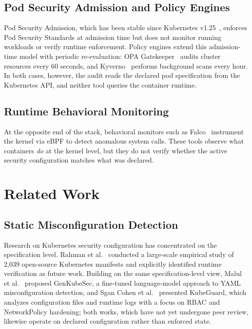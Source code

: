\documentclass[conference]{IEEEtran}
\begin{document}
\subsection{Pod Security Admission and Policy Engines}

Pod Security Admission, which has been stable since Kubernetes v1.25~\cite{k8spsa2022}, enforces Pod Security Standards at admission time but does not monitor running workloads or verify runtime enforcement. Policy engines extend this admission-time model with periodic re-evaluation: OPA Gatekeeper~\cite{gatekeeper2024} audits cluster resources every 60 seconds, and Kyverno~\cite{kyverno2024} performs background scans every hour. In both cases, however, the audit reads the declared pod specification from the Kubernetes API, and neither tool queries the container runtime.

\subsection{Runtime Behavioral Monitoring}

At the opposite end of the stack, behavioral monitors such as Falco~\cite{falco2024} instrument the kernel via eBPF to detect anomalous system calls. These tools observe what containers \emph{do} at the kernel level, but they do not verify whether the active security configuration matches what was declared.

\section{Related Work}

\subsection{Static Misconfiguration Detection}

Research on Kubernetes security configuration has concentrated on the specification level. Rahman et al.~\cite{rahman2023} conducted a large-scale empirical study of 2,039 open-source Kubernetes manifests and explicitly identified runtime verification as future work. Building on the same specification-level view, Malul et al.~\cite{malul2024} proposed GenKubeSec, a fine-tuned language-model approach to YAML misconfiguration detection, and Sgan Cohen et al.~\cite{sgancohen2025} presented KubeGuard, which analyzes configuration files and runtime logs with a focus on RBAC and NetworkPolicy hardening; both works, which have not yet undergone peer review, likewise operate on declared configuration rather than enforced state.
\end{document}
